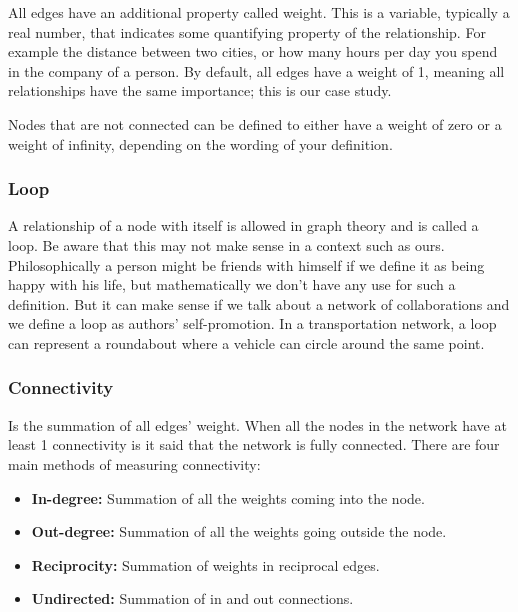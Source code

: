 All edges have an additional property called weight. This is a variable, typically a real number, that indicates some quantifying property of the relationship. For example the distance between two cities, or how many hours per day you spend in the company of a person. By default, all edges have a weight of 1, meaning all relationships have the same importance; this is our case study.



Nodes that are not connected can be defined to either have a weight of zero or a weight of infinity, depending on the wording of your definition.

\subsubsection{Loop}

A relationship of a node with itself is allowed in graph theory and is called a loop. Be aware that this may not make sense in a context such as ours. Philosophically a person might be friends with himself if we define it as being happy with his life, but mathematically we don't have any use for such a definition. But it can make sense if we talk about a network of collaborations and we define a loop as authors' self-promotion. In a transportation network, a loop can represent a roundabout where a vehicle can circle around the same point.

\subsubsection{Connectivity}
\label{network:Connectivity}

Is the summation of all edges' weight. When all the nodes in the network have at least 1 connectivity is it said that the network is fully connected. There are four main methods of measuring connectivity:

\begin{itemize}
    \item \textbf{In-degree:} Summation of all the weights coming into the node.
    \item \textbf{Out-degree:} Summation of all the weights going outside the node.
    \item \textbf{Reciprocity:} Summation of weights in reciprocal edges.
    \item \textbf{Undirected:} Summation of in and out connections.
\end{itemize}

